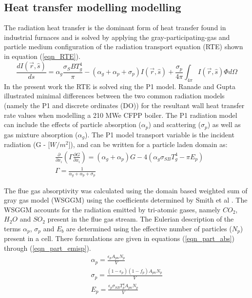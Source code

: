 \documentclass[review]{elsarticle}
\begin{document}
\subsection{Heat transfer modelling modelling}
The radiation heat transfer is the dominant form of heat transfer found in industrial furnaces \citep{Basu2000} and is solved by applying the gray-participating-gas and particle medium configuration of the radiation transport equation (RTE) \cite{Modest2013} shown in equation (\ref{eqn_RTE}).
\begin{equation}\label{eqn_RTE}
\frac{d I(\vec{r},\hat{s})}{ds} = \alpha_g \frac{\sigma_SB T_{g}^4}{\pi}-(\alpha_g+\alpha_p+\sigma_p)I(\vec{r},\hat{s}) + \frac{\sigma_p}{4\pi}\int_{4\pi}I(\vec{r},\hat{s})\Phi d \Omega
\end{equation}
In the present work the RTE is solved sing the P1 model. Ranade and Gupta \cite{Ranade2015} illustrated minimal differences between the two common radiation models (namely the P1 and discrete ordinates (DO)) for the resultant wall heat transfer rate values when modelling a 210 MWe CFPP boiler. The P1 radiation model can include the effects of particle absorption ($\alpha_p$) and scattering ($\sigma_p$) as well as gas mixture absorption ($\alpha_g$). The P1 model transport variable is the incident radiation (G - [$W/m^2$]), and can be written for a particle laden domain as:
\begin{equation}
\begin{split}
&\frac{\partial}{\partial x_{i}}\left(\Gamma\frac{\partial G}{\partial x_{i}}\right)=\left(\alpha_g+\alpha_p\right)G-4\left(\alpha_g \sigma_{SB} T_{g}^4-\pi E_p \right)\\
&\Gamma = \frac{1}{\alpha_g+\alpha_p+\sigma_p}
\end{split}
\end{equation}

The flue gas absorptivity was calculated using the domain based weighted sum of gray gas model (WSGGM) using the coefficients determined by Smith et al \cite{Smith1982}. The WSGGM accounts for the radiation emitted by tri-atomic gases, namely $CO_2$, $H_2O$ and $SO_2$ present in the flue gas stream. The Eulerian description of the terms $\alpha_p$, $\sigma_p$ and $E_b$ are determined using the effective number of particles ($N_p$) present in a cell. There formulations are given in equations (\ref{eqn_part_abs}) through (\ref{eqn_part_emisp}).
\begin{gather}
\alpha_p = \frac{\epsilon_p A_{pn}N_p}{V} \label{eqn_part_abs}\\
\sigma_p = \frac{(1-\epsilon_p)(1-f_p) A_{pn}N_p}{V} \label{eqn_part_scat} \\
E_p = \frac{\epsilon_p \sigma_{SB} T_p^4 A_{pn}N_p}{V}\label{eqn_part_emisp}
\end{gather}
\end{document}
